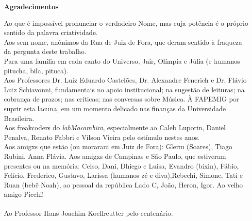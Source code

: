 \newpage
\begin{flushright}
\huge{\textbf{Agradecimentos}}

\small{Ao que é impossível pronunciar o verdadeiro Nome, mas cuja potência é o próprio sentido da palavra criatividade.
\ \\
Aos sem nome, anônimos da Rua de Juiz de Fora, que deram sentido à fraqueza da pergunta deste trabalho.
\ \\
Para uma família em cada canto do Universo, Jair, Olímpia e Júlia (e humanos pitucha, bila, pituca). 
\ \\
Aos Professores Dr. Luiz Eduardo Castelões, Dr. Alexandre Fenerich e Dr. Flávio Luiz Schiavonni, fundamentais no apoio institucional; na sugestão de leituras; na cobrança de prazos; nas críticas; nas conversas sobre Música. À FAPEMIG por suprir esta lacuna, em um momento delicado nas finanças da Universidade Brasileira.
\ \\
Aos freakcoders do \emph{labMacambira}, especialmente ao Caleb Luporin, Daniel Penalva, Renato Fabbri e Vilson Vieira pelo estímulo nestes anos. 
\ \\
Aos amigxs que estão (ou moraram em Juiz de Fora): Glerm (Soares), Tiago Rubini, Anna Flávia. Aos amigxs de Campinas e São Paulo, que estiveram presentes ou na memória: Celso, Dani, Dhiego e Luisa, Evandro (bixin), Fábio, Felício, Frederico, Gustavo, Larissa (humanos zé e diva),Rebechi, Simone, Tati e Ruan (bebê Noah),  ao pessoal da república Lado C, João, Heron, Igor.  Ao velho amigo Picchi!
\ \\
\ \\
Ao Professor Hans Joachim Koellreutter pelo centenário.}
\end{flushright}

\vfil \ 

\newpage